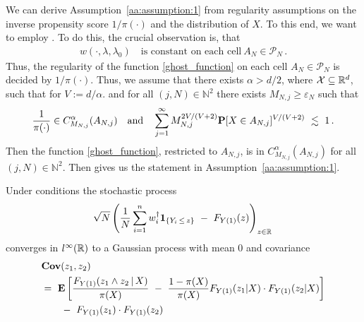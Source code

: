 \begin{remark}
  We can derive Assumption~\ref{aa:assumption:1} from regularity assumptions on the inverse propensity score 
  $1/\pi(\cdot)$ and the distribution of $X$.
  To this end, we want to employ \cite[Corollary~2.7.4]{vaart2013}.
  To do this, the crucial observation is, that
  \begin{gather*}
    w(\cdot,\lambda,\lambda_0)
    \quad
    \text{is constant on each cell}\ 
    A_N\in\mathcal{P}_N
    \,.
  \end{gather*}
  Thus, the regularity of the function \eqref{ghost_function}
  on each cell $A_N\in\mathcal{P}_N$ is decided by 
  $1/\pi(\cdot)$.
  Thus, we assume that there exists
  $\alpha>d/2$, where $\mathcal{X}\subseteq \mathbb{R}^d$, such
  that for 
  $V:=d/\alpha$.
 and for all 
$
(j,N)\in\mathbb{N}^2
$
there exists 
$M_{N,j}\ge \varepsilon_N$ such that 
\begin{gather*}
  \frac{1}{\pi(\cdot)}
  \in C^\alpha_{M_{N,j}}(A_{N,j})
  \quad
  \text{and}
  \quad
  \sum_{j=1}^{\infty} 
  M_{N,j}^{2V/(V+2)}
  \P
  [
  X\in A_{N,j}
  ]^{V/(V+2)}
  \ 
  \lesssim
  \ 
  1
  \,.
\end{gather*}
Then the function \ref{ghost_function}, restricted to $A_{N,j}$, is in 
$
  C^\alpha_{M_{N,j}}(A_{N,j})
$
for all 
$
(j,N)\in\mathbb{N}^2
$.
Then \cite[Corollary~2.7.4]{vaart2013} gives us the statement 
in
Assumption~\ref{aa:assumption:1}.
\end{remark}
\begin{ftheorem}
  \label{aa:mean:th}
  Under conditions 
the stochastic process
\begin{gather}
    \sqrt{N}
    \left( 
  \frac{1}{N}
    \sum_{i=1}^{n} 
    w_i^\dagger
    \mathbf{1}
    _{\left\{ Y_i\,\le\, z \right\}}
    \ 
    -
    \ 
    F_{Y(1)}(z)
    \right)
    _{z\in\R}
    \,
  \end{gather}
  converges in
  $l^\infty(\mathbb{R})$
  to a Gaussian process with mean 0 and covariance
\begin{align}
  \label{cov:lp}
 \begin{split}
  &
  \mathbf{Cov}
  (z_1,z_2)
  \\
  &
  =\ 
  \E
  \left[ 
 \frac{
 F_{Y(1)}(z_1 \land z_2\,|\,X)
}{\pi(X)}
\ 
-
\ 
 \frac{1-\pi(X)}{\pi(X)}
 F_{Y(1)}(z_1|X)
 \cdot
 F_{Y(1)}(z_2|X)
  \right]
  \\
  &
  \qquad 
 -
 \ 
 F_{Y(1)}(z_1)
 \cdot
 F_{Y(1)}(z_2)
 \end{split}
\end{align}
\end{ftheorem}

